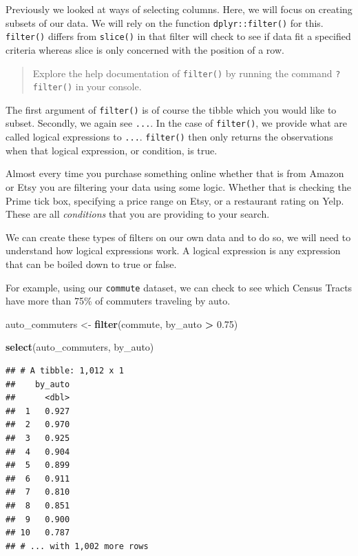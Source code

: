 \documentclass[
]{book}
\newenvironment{Shaded}{\begin{snugshade}}{\end{snugshade}}
\newcommand{\FloatTok}[1]{\textcolor[rgb]{0.00,0.00,0.81}{#1}}
\newcommand{\KeywordTok}[1]{\textcolor[rgb]{0.13,0.29,0.53}{\textbf{#1}}}
\newcommand{\NormalTok}[1]{#1}
\newcommand{\OperatorTok}[1]{\textcolor[rgb]{0.81,0.36,0.00}{\textbf{#1}}}
\newcommand{\StringTok}[1]{\textcolor[rgb]{0.31,0.60,0.02}{#1}}
\begin{document}
Previously we looked at ways of selecting columns. Here, we will focus on creating subsets of our data. We will rely on the function \texttt{dplyr::filter()} for this. \texttt{filter()} differs from \texttt{slice()} in that filter will check to see if data fit a specified criteria whereas slice is only concerned with the position of a row.

\begin{quote}
Explore the help documentation of \texttt{filter()} by running the command \texttt{?filter()} in your console.
\end{quote}

The first argument of \texttt{filter()} is of course the tibble which you would like to subset. Secondly, we again see \texttt{...}. In the case of \texttt{filter()}, we provide what are called logical expressions to \texttt{...}. \texttt{filter()} then only returns the observations when that logical expression, or condition, is true.

Almost every time you purchase something online whether that is from Amazon or Etsy you are filtering your data using some logic. Whether that is checking the Prime tick box, specifying a price range on Etsy, or a restaurant rating on Yelp. These are all \emph{conditions} that you are providing to your search.

We can create these types of filters on our own data and to do so, we will need to understand how logical expressions work. A logical expression is any expression that can be boiled down to true or false.

For example, using our \texttt{commute} dataset, we can check to see which Census Tracts have more than 75\% of commuters traveling by auto.

\begin{Shaded}
\begin{Highlighting}[]
\NormalTok{auto\_commuters \textless{}{-}}\StringTok{ }\KeywordTok{filter}\NormalTok{(commute, by\_auto }\OperatorTok{\textgreater{}}\StringTok{ }\FloatTok{0.75}\NormalTok{)}

\KeywordTok{select}\NormalTok{(auto\_commuters, by\_auto)}
\end{Highlighting}
\end{Shaded}

\begin{verbatim}
## # A tibble: 1,012 x 1
##    by_auto
##      <dbl>
##  1   0.927
##  2   0.970
##  3   0.925
##  4   0.904
##  5   0.899
##  6   0.911
##  7   0.810
##  8   0.851
##  9   0.900
## 10   0.787
## # ... with 1,002 more rows
\end{verbatim}
\end{document}
